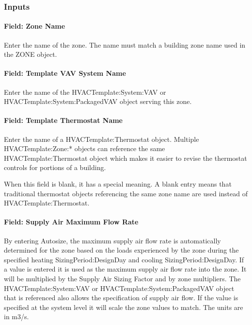 \subsubsection{Inputs}\label{inputs-11-006}

\paragraph{Field: Zone Name}\label{field-zone-name-10}

Enter the name of the zone. The name must match a building zone name used in the ZONE object.

\paragraph{Field: Template VAV System Name}\label{field-template-vav-system-name-2}

Enter the name of the HVACTemplate:System:VAV or HVACTemplate:System:PackagedVAV object serving this zone.

\paragraph{Field: Template Thermostat Name}\label{field-template-thermostat-name-10}

Enter the name of a HVACTemplate:Thermostat object. Multiple HVACTemplate:Zone:* objects can reference the same HVACTemplate:Thermostat object which makes it easier to revise the thermostat controls for portions of a building.

When this field is blank, it has a special meaning. A blank entry means that traditional thermostat objects referencing the same zone name are used instead of HVACTemplate:Thermostat.

\paragraph{Field: Supply Air Maximum Flow Rate}\label{field-supply-air-maximum-flow-rate-3}

By entering Autosize, the maximum supply air flow rate is automatically determined for the zone based on the loads experienced by the zone during the specified heating SizingPeriod:DesignDay and cooling SizingPeriod:DesignDay. If a value is entered it is used as the maximum supply air flow rate into the zone. It will be multiplied by the Supply Air Sizing Factor and by zone multipliers. The HVACTemplate:System:VAV or HVACTemplate:System:PackagedVAV object that is referenced also allows the specification of supply air flow. If the value is specified at the system level it will scale the zone values to match. The units are in m3/s.


